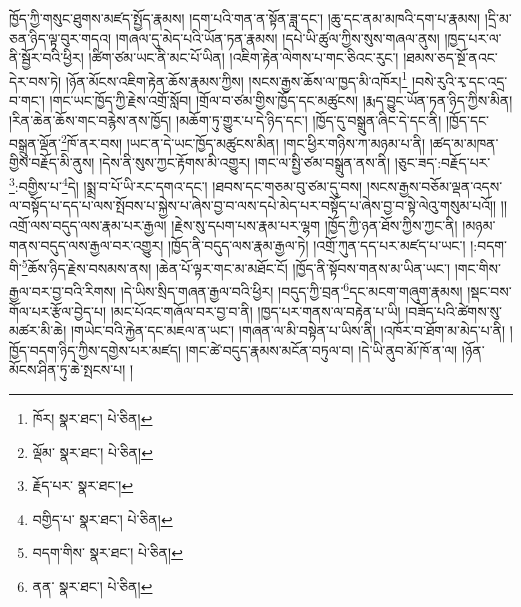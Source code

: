 ཁྱོད་ཀྱི་གསུང་ཐུགས་མཛད་སྤྱོད་རྣམས། །དག་པའི་གན་ན་སྟོན་ཟླ་དང་། །ཆུ་དང་ནམ་མཁའི་དག་པ་རྣམས། །དྲི་མ་ཅན་ཉིད་ལྟ་བུར་གདའ། །གཞལ་དུ་མེད་པའི་ཡོན་ཏན་རྣམས། །དཔེ་ཡི་ཚུལ་ཀྱིས་སུས་གཞལ་ནུས། །ཁྱད་པར་ལ་ནི་སྦྱོར་བའི་ཕྱིར། །ཚིག་ཙམ་ཡང་ནི་མང་པོ་ཡིན། །འཇིག་རྟེན་ལེགས་པ་གང་ཅིའང་རུང་། །ཐམས་ཅད་སྔོ་ནའང་དེར་བས་ཏེ། །ཉོན་མོངས་འཇིག་རྟེན་ཆོས་རྣམས་ཀྱིས། །སངས་རྒྱས་ཆོས་ལ་ཁྱད་མི་འཁོར།\footnote{ཁོར།  སྣར་ཐང་།  པེ་ཅིན། } །བསེ་རུའི་རྭ་དང་འདྲ་བ་གང་། །གང་ཡང་ཁྱོད་ཀྱི་རྗེས་འགྲོ་སློབ། །གྲོལ་བ་ཙམ་གྱིས་ཁྱོད་དང་མཚུངས། །རྨད་བྱུང་ཡོན་ཏན་ཉིད་ཀྱིས་མིན། །རིན་ཆེན་ཆོས་གང་བརྙེས་ནས་ཁྱོད། །མཆོག་ཏུ་གྱུར་པ་དེ་ཉིད་དང་། །ཁྱོད་དུ་བསྒྲུན་ཞིང་དེ་དང་ནི། །ཁྱོད་དང་བསྒྲུན་ལྡོན་\footnote{ལྡོམ་  སྣར་ཐང་།  པེ་ཅིན། }ཁོ་ནར་བས། །ཡང་ན་དེ་ཡང་ཁྱོད་མཚུངས་མིན། །གང་ཕྱིར་གཉིས་ཀ་མཉམ་པ་ནི། །ཚད་མ་མཁན་གྱིས་བརྗོད་མི་ནུས། །དེས་ནི་སུས་ཀྱང་རྟོགས་མི་འགྱུར། །གང་ལ་སྤྱི་ཙམ་བསྒྲུན་ནས་ནི། །ཅུང་ཟད་:བརྗོད་པར་\footnote{རྗོད་པར་  སྣར་ཐང་། }:བགྱིས་པ་\footnote{བགྱིད་པ་  སྣར་ཐང་།  པེ་ཅིན། }དེ། །སྨྲ་བ་པོ་ཡི་རང་དགའ་དང་། །ཐབས་དང་གཅམ་བུ་ཙམ་དུ་བས། །སངས་རྒྱས་བཅོམ་ལྡན་འདས་ལ་བསྟོད་པ་དད་པ་ལས་སྤོབས་པ་སྐྱེས་པ་ཞེས་བྱ་བ་ལས་དཔེ་མེད་པར་བསྟོད་པ་ཞེས་བྱ་བ་སྟེ་ལེའུ་གསུམ་པའོ།། །།འགྲོ་ལས་བདུད་ལས་རྣམ་པར་རྒྱལ། །རྗེས་སུ་དཔག་པས་རྣམ་པར་ལྷག །ཁྱོད་ཀྱི་ཉན་ཐོས་ཀྱིས་ཀྱང་ནི། །མཉམ་གནས་བདུད་ལས་རྒྱལ་བར་འགྱུར། །ཁྱོད་ནི་བདུད་ལས་རྣམ་རྒྱལ་ཏེ། །འགྲོ་ཀུན་དད་པར་མཛད་པ་ཡང་། །:བདག་གི་\footnote{བདག་གིས་  སྣར་ཐང་།  པེ་ཅིན། }ཆོས་ཉིད་རྗེས་བསམས་ནས། །ཆེན་པོ་ལྟར་གང་མ་མཐོང་ངོ། །ཁྱོད་ནི་སྟོབས་གནས་མ་ཡིན་ཡང་། །གང་གིས་རྒྱལ་བར་བྱ་བའི་རིགས། །དེ་ཡིས་སྲིད་གཞན་རྒྱལ་བའི་ཕྱིར། །བདུད་ཀྱི་བྲན་\footnote{ནན་  སྣར་ཐང་།  པེ་ཅིན། }དང་མངག་གཞུག་རྣམས། །སྡང་བས་གོལ་པར་རྩོལ་བྱེད་པ། །མང་པོའང་གཞོལ་བར་བྱ་བ་ནི། །ཁྱད་པར་གནས་ལ་བརྟེན་པ་ཡི། །བཟོད་པའི་ཚེགས་སུ་མཚར་མི་ཆེ། །གཡེང་བའི་རྐྱེན་དང་མཇལ་ན་ཡང་། །གཞན་ལ་མི་བསྟེན་པ་ཡིས་ནི། །འཁོར་བ་ཐོག་མ་མེད་པ་ནི། །ཁྱོད་བདག་ཉིད་ཀྱིས་དགྱེས་པར་མཛད། །གང་ཚེ་བདུད་རྣམས་མངོན་བཏུལ་བ། །དེ་ཡི་ནུབ་མོ་ཁོ་ན་ལ། །ཉོན་མོངས་ཤིན་ཏུ་ཆེ་སྤངས་པ། །
